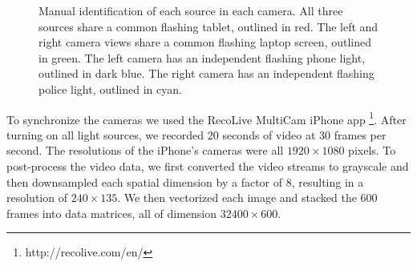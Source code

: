 \begin{figure}
  \begin{center}
    \caption{Manual identification of each source in each camera. All three sources share
      a common flashing tablet, outlined in red. The left and right camera views share a
      common flashing laptop screen, outlined in green. The left camera has an independent
      flashing phone light, outlined in dark blue. The right camera has an independent
      flashing police light, outlined in cyan.}
    \label{fig:chpt10:mcca_sources}
  \end{center}
\end{figure}

To synchronize the cameras we used the RecoLive MultiCam iPhone app
\footnote{http://recolive.com/en/}. After turning on all light sources, we recorded 20
seconds of video at 30 frames per second. The resolutions of the iPhone's cameras were all
$1920\times 1080$ pixels. To post-process the video data, we first converted the video
streams to grayscale and then downsampled each spatial dimension by a factor of 8,
resulting in a resolution of $240\times 135$. We then vectorized each image and stacked
the 600 frames into data matrices, all of dimension $32400 \times 600$. 

